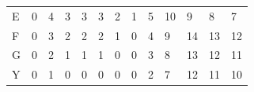 \documentclass{bredelebeamer}
\begin{document}
\begin{frame}
\begin{table}[]
\begin{tabular}{lllllllllllll}
\multicolumn{1}{l|}{E}  & \multicolumn{1}{l|}{0} & \multicolumn{1}{l|}{4} & \multicolumn{1}{l|}{3} & \multicolumn{1}{l|}{3} & \multicolumn{1}{l|}{3} & \multicolumn{1}{l|}{2} & \multicolumn{1}{l|}{1} & \multicolumn{1}{l|}{5} & \multicolumn{1}{l|}{10} & \multicolumn{1}{l|}{9}                          & \multicolumn{1}{l|}{8}  & \multicolumn{1}{l|}{7}  \\ \cline{2-13} 
\multicolumn{1}{l|}{F}  & \multicolumn{1}{l|}{0} & \multicolumn{1}{l|}{3} & \multicolumn{1}{l|}{2} & \multicolumn{1}{l|}{2} & \multicolumn{1}{l|}{2} & \multicolumn{1}{l|}{1} & \multicolumn{1}{l|}{0} & \multicolumn{1}{l|}{4} & \multicolumn{1}{l|}{9}  & \multicolumn{1}{l|}{\cellcolor[HTML]{3166FF}14} & \multicolumn{1}{l|}{13} & \multicolumn{1}{l|}{12} \\ \cline{2-13} 
\multicolumn{1}{l|}{G}  & \multicolumn{1}{l|}{0} & \multicolumn{1}{l|}{2} & \multicolumn{1}{l|}{1} & \multicolumn{1}{l|}{1} & \multicolumn{1}{l|}{1} & \multicolumn{1}{l|}{0} & \multicolumn{1}{l|}{0} & \multicolumn{1}{l|}{3} & \multicolumn{1}{l|}{8}  & \multicolumn{1}{l|}{13}                         & \multicolumn{1}{l|}{12} & \multicolumn{1}{l|}{11} \\ \cline{2-13} 
\multicolumn{1}{l|}{Y}  & \multicolumn{1}{l|}{0} & \multicolumn{1}{l|}{1} & \multicolumn{1}{l|}{0} & \multicolumn{1}{l|}{0} & \multicolumn{1}{l|}{0} & \multicolumn{1}{l|}{0} & \multicolumn{1}{l|}{0} & \multicolumn{1}{l|}{2} & \multicolumn{1}{l|}{7}  & \multicolumn{1}{l|}{12}                         & \multicolumn{1}{l|}{11} & \multicolumn{1}{l|}{10} \\ \cline{2-13} 
\end{tabular}
\end{table}

\end{frame}
\end{document}
